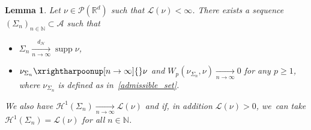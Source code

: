 \documentclass[10pt]{amsart}
\newtheorem{lemma}[theorem]{Lemma}
\theoremstyle{definition}
\newcommand\cH{\mathcal{H}}
\newcommand{\RR}{\mathbb{R}}
\DeclareMathOperator{\supp}{supp}
\newcommand{\distH}{d_{\mathcal{H}}}
\begin{document}
\begin{lemma}
\label{lemma.approximation_lemma}
Let $\nu \!\in\! \mathcal{P}(\RR^d)$ such that $\mathcal{L}(\nu) \!<\! \infty$. There exists a sequence $\left(\Sigma_n\right)_{n \in \mathbb{N}} \!\subset\! \mathcal{A}$ such that
\begin{itemize}
\item $\Sigma_n \xrightarrow[n \to \infty]{\distH} \supp \nu$,
\item $\nu_{\Sigma_n} \xrightharpoonup[n \to \infty]{} \nu$ and $W_p(\nu_{\Sigma_n}, \nu) \xrightarrow[n \to \infty]{} 0$ for any $p \ge 1$, where $\nu_{\Sigma_n}$ is defined as in~\eqref{admissible_set}.
\end{itemize}
We also have $\cH^1(\Sigma_n) \xrightarrow[n \to \infty]{} \mathcal{L}(\nu)$ and if, in addition $\mathcal{L}(\nu) > 0$, we~can take $\cH^1(\Sigma_n) = \mathcal{L}(\nu)$ for all $n \in \mathbb{N}$.
\end{lemma}
\end{document}
